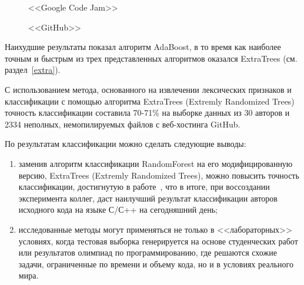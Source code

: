 \begin{figure}[h!]
\caption{ <<Google Code Jam>> }
\label{google:google}
\end{figure}

\begin{figure}[h!]
\caption{ <<GitHub>> }
\label{github:github}
\end{figure}

Наихудшие результаты показал алгоритм AdaBoost, в то время как наиболее точным и быстрым из трех 
представленных алгоритмов оказался ExtraTrees (см. раздел~\ref{extra}). 

С использованием метода, основанного на извлечении лексических признаков и классификации с помощью алгоритма 
ExtraTrees (Extremly Randomized Trees) точность классификации составила 70-71\% на выборке данных из 30 авторов
и 2334 неполных, немопилируемых файлов с веб-хостинга GitHub. 

По результатам классификации можно сделать следующие выводы:
\begin{enumerate}
 \item заменив алгоритм классификации RandomForest
 на его модифицированную версию, ExtraTrees (Extremly Randomized Trees),
 можно повысить точность классификации, достигнутую в работе~\cite{git_blame},
 что в итоге, при воссоздании эксперимента коллег, даст наилучший результат классификации
 авторов исходного кода на языке С/С++ на сегодняшний день;
 \item исследованные методы могут применяться не только в <<лабораторных>> условиях, когда
тестовая выборка генерируется на основе студенческих работ или результатов олимпиад по программированию,
где решаются схожие задачи, ограниченные по времени и объему кода, но и в условиях реального мира.
\end{enumerate}


\clearpage